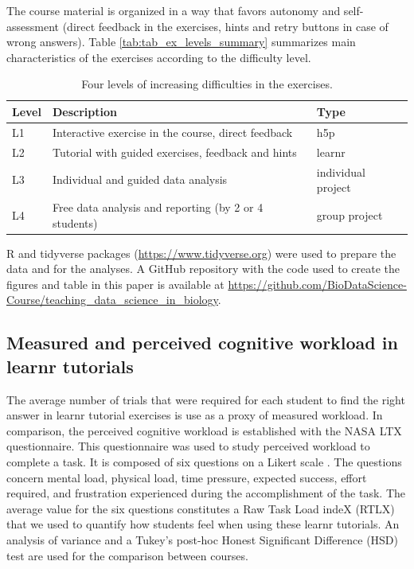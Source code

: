 \documentclass{aims}
\theoremstyle{definition}
\begin{document}
The course material is organized in a way that favors autonomy and
self-assessment (direct feedback in the exercises, hints and retry
buttons in case of wrong answers). Table
\ref {tab:tab_ex_levels_summary} summarizes main characteristics of the
exercises according to the difficulty level.

\begin{table}

\caption{\label{tab:tab_ex_levels_summary}\label{tab:tab_ex_levels} Four levels of increasing difficulties in the exercises.}
\centering
\begin{tabular}[t]{l|l|l}
\hline
Level & Description & Type\\
\hline
L1 & Interactive exercise in the course, direct feedback & h5p\\
\hline
L2 & Tutorial with guided exercises, feedback and hints & learnr\\
\hline
L3 & Individual and guided data analysis & individual project\\
\hline
L4 & Free data analysis and reporting (by 2 or 4 students) & group project\\
\hline
\end{tabular}
\end{table}

R and tidyverse \cite{Wickham2019} packages
(\url{https://www.tidyverse.org}) were used to prepare the data and for
the analyses. A GitHub repository with the code used to create the
figures and table in this paper is available at
\url{https://github.com/BioDataScience-Course/teaching_data_science_in_biology}.

\hypertarget{measured-and-perceived-cognitive-workload-in-learnr-tutorials}{%
\subsection{Measured and perceived cognitive workload in learnr
tutorials}\label{measured-and-perceived-cognitive-workload-in-learnr-tutorials}}

The average number of trials that were required for each student to find
the right answer in learnr tutorial exercises is use as a proxy of
measured workload. In comparison, the perceived cognitive workload is
established with the NASA LTX questionnaire. This questionnaire was used
to study perceived workload to complete a task. It is composed of six
questions on a Likert scale \cite{Hart1988}. The questions concern
mental load, physical load, time pressure, expected success, effort
required, and frustration experienced during the accomplishment of the
task. The average value for the six questions constitutes a Raw Task
Load indeX (RTLX) \cite{Byers1989} that we used to quantify how students
feel when using these learnr tutorials. An analysis of variance and a
Tukey's post-hoc Honest Significant Difference (HSD) test are used for
the comparison between courses.
\end{document}
